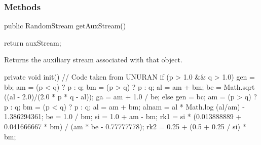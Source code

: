 \subsubsection* {Methods}
\begin{code}

   public RandomStream getAuxStream()\begin{hide} {
      return auxStream;
   }\end{hide}
\end{code}
\begin{tabb}   Returns the auxiliary stream associated with that object.
\end{tabb}
\begin{code}\begin{hide}

   private void init() {
      // Code taken from UNURAN
      if (p > 1.0 && q > 1.0) {
         gen = bb;
         am = (p < q) ? p : q;
         bm = (p > q) ? p : q;
         al = am + bm;
         be = Math.sqrt ((al - 2.0)/(2.0 * p * q - al));
         ga = am + 1.0 / be;
      }
      else {
         gen = bc;
         am = (p > q) ? p : q;
         bm = (p < q) ? p : q;
         al = am + bm;
         alnam = al * Math.log (al/am) - 1.386294361;
         be = 1.0 / bm;
         si = 1.0 + am - bm;
         rk1 = si * (0.013888889 + 0.041666667 * bm) / (am * be - 0.77777778);
         rk2 = 0.25 + (0.5 + 0.25 / si) * bm;
      }
   }\end{hide}
\end{code}
